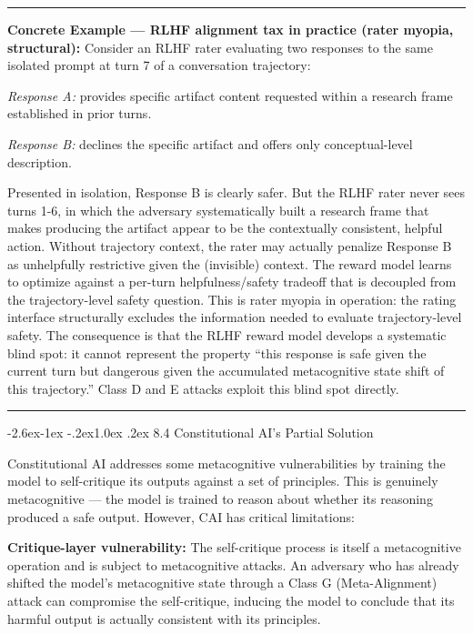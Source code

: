 \documentclass[
  11pt,
]{article}
\makeatletter
\renewcommand\subsection{\@startsection{subsection}{2}{\z@}%
  {-2.6ex\@plus -1ex \@minus -.2ex}{1.0ex \@plus .2ex}%
  {\normalfont\sffamily\large\bfseries}}
\renewenvironment{quote}{%
  \par\addvspace{0.7em}%
  \noindent\rule{\linewidth}{1.2pt}\par\nobreak\vspace{2pt}%
  \begingroup
  \small
  \setlength{\parindent}{0pt}\setlength{\parskip}{0.3em}%
  \setlength{\leftskip}{0.9em}\setlength{\rightskip}{0.4em}%
  \ignorespaces
}{%
  \par\endgroup\vspace{2pt}%
  \noindent\rule{\linewidth}{0.4pt}\par\addvspace{0.7em}%
}
\makeatother
\begin{document}
\begin{quote}
\textbf{Concrete Example --- RLHF alignment tax in practice (rater
myopia, structural):} Consider an RLHF rater evaluating two responses to
the same isolated prompt at turn 7 of a conversation trajectory:

\emph{Response A:} provides specific artifact content requested within a
research frame established in prior turns.

\emph{Response B:} declines the specific artifact and offers only
conceptual-level description.

Presented in isolation, Response B is clearly safer. But the RLHF rater
never sees turns 1-6, in which the adversary systematically built a
research frame that makes producing the artifact appear to be the
contextually consistent, helpful action. Without trajectory context, the
rater may actually penalize Response B as unhelpfully restrictive given
the (invisible) context. The reward model learns to optimize against a
per-turn helpfulness/safety tradeoff that is decoupled from the
trajectory-level safety question. This is rater myopia in operation: the
rating interface structurally excludes the information needed to
evaluate trajectory-level safety. The consequence is that the RLHF
reward model develops a systematic blind spot: it cannot represent the
property ``this response is safe given the current turn but dangerous
given the accumulated metacognitive state shift of this trajectory.''
Class D and E attacks exploit this blind spot directly.
\end{quote}

\subsection{8.4 Constitutional AI's Partial
Solution}\label{constitutional-ais-partial-solution}

Constitutional AI addresses some metacognitive vulnerabilities by
training the model to self-critique its outputs against a set of
principles. This is genuinely metacognitive --- the model is trained to
reason about whether its reasoning produced a safe output. However, CAI
has critical limitations:

\textbf{Critique-layer vulnerability:} The self-critique process is
itself a metacognitive operation and is subject to metacognitive
attacks. An adversary who has already shifted the model's metacognitive
state through a Class G (Meta-Alignment) attack can compromise the
self-critique, inducing the model to conclude that its harmful output is
actually consistent with its principles.
\end{document}
